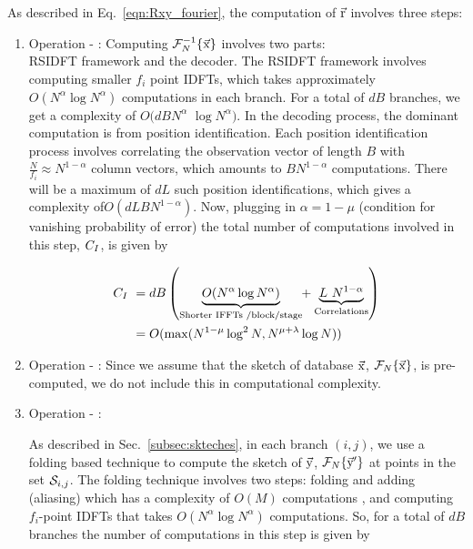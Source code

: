 As described in Eq.~\ref{eqn:Rxy_fourier}, the computation of $\vec{\mathrm{r}}$ involves three steps:
\begin{enumerate} 
	\item  Operation - :
	 Computing $\mathcal{F}_{N}^{-1}\{ \vec{\mathrm{x}} \}$ involves two parts:\\ RSIDFT framework and the decoder. The RSIDFT framework involves computing smaller $f_i$ point IDFTs, which takes approximately $O(N^{\alpha} \log N^{\alpha})$ computations in each branch. For a total of $dB$ branches, we get a complexity of $O(dB N^{\alpha}$ $\log N^{\alpha})$. In the decoding process, the dominant computation is from position identification. Each position identification process involves correlating the observation vector of length $B$ with $\frac{N}{f_i} \approx N^{1-\alpha}$ column vectors, which amounts to $B N^{1-\alpha}$ computations. There will be a maximum of $dL$ such position identifications, which gives a complexity of$O(dLBN^{1-\alpha} )$. Now, plugging in $\alpha = 1-\mu$ (condition for vanishing probability of error) the total number of computations involved in this step, $C_{\RNum{1}}$, is given by
	
	\begin{align*}
	C_{\RNum{1}} \ &=  {d B}  \left (
	\underset{\text{Shorter IFFTs /block/stage} }{\underbrace{ O(N^{\alpha}  \log N^{\alpha})}} \hspace{-3pt}+ \underset{\text{Correlations} }{\underbrace{ L~N^{1-\alpha}}} \right )\\ 
	&=  O(\max(N^{1-\mu}\log^2 N ,N^{\mu+\lambda}\log N)) 
		\end{align*}
	
	\item  Operation - :
	Since we assume that the sketch of database $\vec{\mathrm{x}}$, $\mathcal{F}_{N}\{\vec{\mathrm{x}}\}$, is pre-computed, we do not include this in computational complexity.
	
	\item  Operation - :
	
	As described in Sec.~\ref{subsec:skteches}, in each branch $(i,j)$, we use a folding based technique to compute the sketch of $\vec{\mathrm{y}}$, $\mathcal{F}_{N}\{\vec{\mathrm{y}}'\}$ at points in the set $\mathcal{S}_{i,j}$. The folding technique involves two steps: folding and adding (aliasing) which has a complexity of $O(M)$ computations , and computing $f_i$-point IDFTs that takes $O(N^\alpha \log N^{\alpha})$ computations. So, for a total of $dB$ branches the number of computations in this step is given by
	

\end{enumerate}
